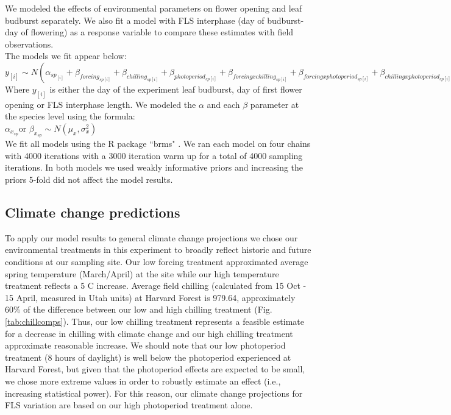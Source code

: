 \documentclass[11pt]{article}
\begin{document}
We modeled the effects of environmental parameters on flower opening and leaf budburst separately.
We also fit a model with FLS interphase (day of budburst- day of flowering) as a response variable to compare these estimates with field observations.\\

The models we fit appear below:\\

$y_{[i]} \sim N(\alpha_{sp_{[i]}}+\beta_{forcing_{sp[i]}}+\beta_{chilling_{sp[i]}}+\beta_{photoperiod_{sp[i]}}+\beta_{forcing x chilling_{sp[i]}}+\beta_{forcing x photoperiod_{sp[i]}}+\beta_{chilling x photoperiod_{sp[i]}})$\\

Where $y_{[i]}$ is either the day of the experiment leaf budburst, day of first flower opening or FLS interphase length.  We modeled the $\alpha$ and each $\beta$ parameter at the species level using the formula:\\

$\alpha_{x_{sp}} $or $\beta_{x_{sp}} \sim N(\mu_x,\sigma^2_x)$\\

\noindent We fit all models using the R package ``brms" \citep{Burkner2018}. We ran each model on four chains with 4000 iterations with a 3000 iteration warm up for a total of 4000 sampling iterations. In both models we used weakly informative priors and increasing the priors 5-fold did not affect the model results.\\


\subsection*{Climate change predictions}
\noindent To apply our model results to general climate change projections we chose our environmental treatments in this experiment to broadly reflect historic and future conditions at our sampling site. Our low forcing treatment approximated average spring temperature (March/April) at the site while our high temperature treatment reflects a 5 \degree C increase. Average field chilling (calculated from 15 Oct - 15 April, measured in Utah units) at Harvard Forest is 979.64, approximately 60\% of the difference between our low and high chilling treatment (Fig. \ref{tab:chillcomps}). Thus, our low chilling treatment represents a feasible estimate for a decrease in chilling with climate change and our high chilling treatment approximate reasonable increase. We should note that our low photoperiod treatment (8 hours of daylight) is well below the photoperiod experienced at Harvard Forest, but given that the photoperiod effects are expected to be small, we chose more extreme values in order to robustly estimate an effect (i.e., increasing statistical power). For this reason, our climate change projections for FLS variation are based on our high photoperiod treatment alone.\\
\end{document}
